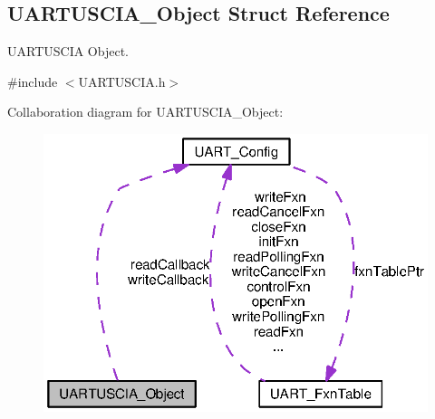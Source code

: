 \subsection{U\-A\-R\-T\-U\-S\-C\-I\-A\-\_\-\-Object Struct Reference}
\label{struct_u_a_r_t_u_s_c_i_a___object}


U\-A\-R\-T\-U\-S\-C\-I\-A Object.  




{\ttfamily \#include $<$U\-A\-R\-T\-U\-S\-C\-I\-A.\-h$>$}



Collaboration diagram for U\-A\-R\-T\-U\-S\-C\-I\-A\-\_\-\-Object\-:
\nopagebreak
\begin{figure}[H]
\begin{center}
\leavevmode
\includegraphics[width=319pt]{struct_u_a_r_t_u_s_c_i_a___object__coll__graph}
\end{center}
\end{figure}

